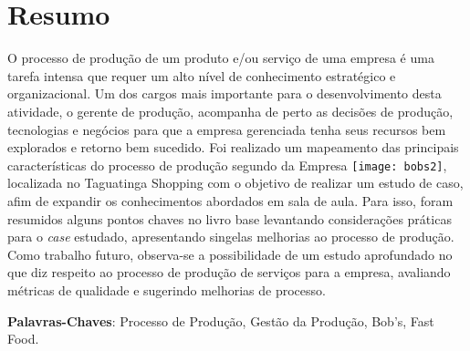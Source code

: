 \chapter[Resumo]{Resumo}
\label{chap:resumo}
	
	O processo de produção de um produto e/ou serviço de uma empresa é uma tarefa intensa que requer um alto nível de conhecimento estratégico e organizacional.  Um dos cargos mais importante para o desenvolvimento desta atividade, o gerente de produção, acompanha de perto as decisões de produção, tecnologias e negócios para que a empresa gerenciada tenha seus recursos bem explorados e retorno bem sucedido. Foi realizado um mapeamento das principais características do processo de produção segundo \cite{slack} da Empresa \texttt{[image: bobs2]}, localizada no Taguatinga Shopping com o objetivo de realizar um estudo de caso, afim de expandir os conhecimentos abordados em sala de aula. Para isso, foram resumidos alguns pontos chaves no livro base levantando considerações práticas para o \emph{case} estudado, apresentando singelas melhorias ao processo de produção. Como trabalho futuro, observa-se a possibilidade de um estudo aprofundado no que diz respeito ao processo de produção de serviços para a empresa, avaliando métricas de qualidade e sugerindo melhorias de processo. 

	\begin{flushleft}
		\textbf{Palavras-Chaves}: Processo de Produção, Gestão da Produção, Bob's, Fast Food.
	\end{flushleft}